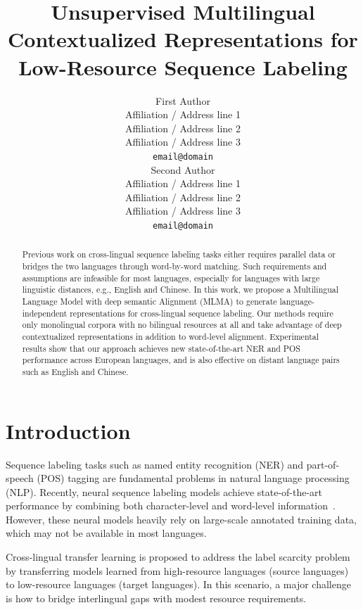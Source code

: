 \documentclass[11pt,a4paper]{article}
\title{Unsupervised Multilingual Contextualized Representations for Low-Resource Sequence Labeling}
\author{First Author \\
	Affiliation / Address line 1 \\
	Affiliation / Address line 2 \\
	Affiliation / Address line 3 \\
	{\tt email@domain} \\\And
	Second Author \\
	Affiliation / Address line 1 \\
	Affiliation / Address line 2 \\
	Affiliation / Address line 3 \\
	{\tt email@domain} \\}
\date{}
\begin{document}
	\maketitle
	\begin{abstract}
		Previous work on cross-lingual sequence labeling tasks either requires parallel data or bridges the two languages through word-by-word matching. Such requirements and assumptions are infeasible for most languages, especially for languages with large linguistic distances, e.g., English and Chinese.
		In this work, we propose a Multilingual Language Model with deep semantic Alignment (MLMA) to generate language-independent representations for cross-lingual sequence labeling. 
		Our methods require only monolingual corpora with no bilingual resources at all and take advantage of deep contextualized representations in
		addition to word-level alignment.
        Experimental results show that our approach achieves new state-of-the-art NER and POS performance across European languages, and is also effective on distant language pairs such as English and Chinese.
	\end{abstract}
	
	\section{Introduction}
	Sequence labeling tasks such as named entity recognition (NER) and part-of-speech (POS) tagging are fundamental problems in natural language processing (NLP). Recently, neural sequence labeling models achieve state-of-the-art performance by combining both character-level and word-level information~\cite{chiu16named,ma16end,lample16neural}. However, these neural models heavily rely on large-scale annotated training data, which may not be available in most languages.
	
	Cross-lingual transfer learning is proposed to address the label scarcity problem by transferring models learned from high-resource languages (source languages) to low-resource languages (target languages). In this scenario, a major challenge is how to bridge interlingual gaps with modest resource requirements.
	
	
\end{document}
